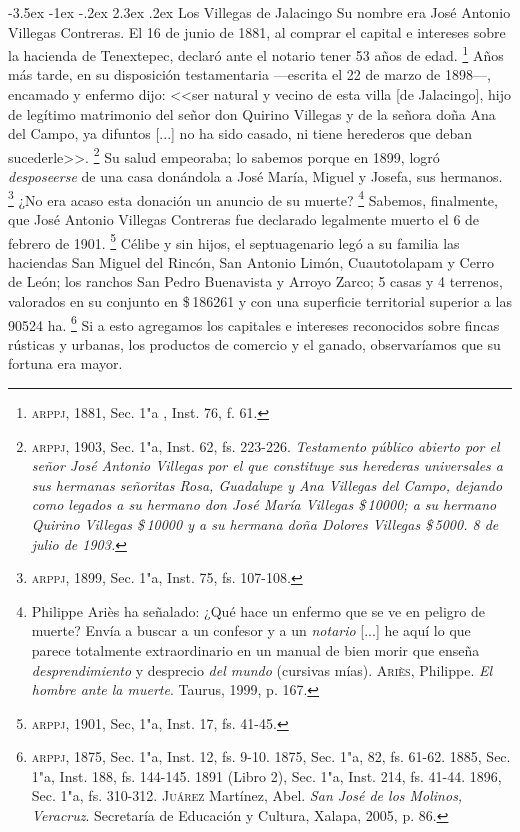 \documentclass[14pt,twoside,final]{extbook} %
\makeatletter
\let\oldfootnote\footnote
\renewcommand\footnote[1]{%
\oldfootnote{\hspace{1mm}#1}}
\renewcommand\section{\@startsection {section}{1}{\z@}%
                                     {-3.5ex \@plus -1ex \@minus -.2ex}%
                                     {2.3ex \@plus .2ex}%
                                     {\normalfont\large\bfseries\sc}}
\makeatother
\begin{document}
\section{Los Villegas de Jalacingo}\label{sec:Villegas-Jalacingo}
Su nombre era José Antonio Villegas Contreras. El 16 de junio de 1881, al comprar el capital e intereses sobre la hacienda de Tenextepec, declaró ante el notario tener 53 años de edad.\footnote{\textsc{arppj}, 1881, Sec. 1"a , Inst. 76, f. 61.} Años más tarde, en su disposición testamentaria ---escrita el 22 de marzo de 1898---, encamado y enfermo dijo: <<ser natural y vecino de esta villa [de Jalacingo], hijo de legítimo matrimonio del señor don Quirino Villegas y de la señora doña Ana del Campo, ya difuntos [...] no ha sido casado, ni tiene herederos que deban sucederle>>.\footnote{\textsc{arppj}, 1903, Sec. 1"a, Inst. 62, fs. 223-226. \emph{Testamento público abierto por el señor José Antonio Villegas por el que constituye sus herederas universales a sus hermanas señoritas Rosa, Guadalupe y Ana Villegas del Campo, dejando como legados a su hermano don José María Villegas \$\,10000; a su hermano Quirino Villegas \$\,10000 y a su hermana doña Dolores Villegas \$\,5000. 8 de julio de 1903.}} Su salud empeoraba; lo sabemos porque en 1899, logró \emph{desposeerse} de una casa donándola a José María, Miguel y Josefa, sus hermanos.\footnote{\textsc{arppj}, 1899, Sec. 1"a, Inst. 75, fs. 107-108.} ¿No era acaso esta donación un anuncio de su muerte?\footnote{Philippe Ariès ha señalado: ¿Qué hace un enfermo que se ve en peligro de muerte? Envía a buscar a un confesor y a un \emph{notario} [...] he aquí lo que parece totalmente extraordinario en un manual de bien morir que enseña \emph{desprendimiento} y desprecio \emph{del mundo} (cursivas mías). \textsc{Ariès}, Philippe. \emph{El hombre ante la muerte}. Taurus, 1999, p. 167.} Sabemos, finalmente, que José Antonio Villegas Contreras fue declarado legalmente muerto el 6 de febrero de 1901.\footnote{\textsc{arppj}, 1901, Sec, 1"a, Inst. 17, fs. 41-45.} Célibe y sin hijos, el septuagenario legó a su familia las haciendas San Miguel del Rincón, San Antonio Limón, Cuautotolapam y Cerro de León; los ranchos San Pedro Buenavista y Arroyo Zarco; 5 casas y 4 terrenos, valorados en su conjunto en \$\,186261 y con una superficie territorial superior a las 90524 ha.\footnote{\textsc{arppj}, 1875, Sec. 1"a, Inst. 12, fs. 9-10. 1875, Sec. 1"a, 82, fs. 61-62. 1885, Sec. 1"a, Inst. 188, fs. 144-145. 1891 (Libro 2), Sec. 1"a, Inst. 214, fs. 41-44. 1896, Sec. 1"a, fs. 310-312. \textsc{Juárez} Martínez, Abel. \emph{San José de los Molinos, Veracruz}. Secretaría de Educación y Cultura, Xalapa, 2005, p. 86.} Si a esto agregamos los capitales e intereses reconocidos sobre fincas rústicas y urbanas, los productos de comercio y el ganado, observaríamos que su fortuna era mayor.
\end{document}
